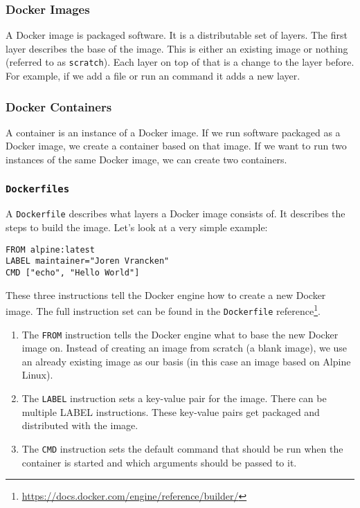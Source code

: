 \subsubsection{Docker Images}
A Docker image is packaged software. It is a distributable set of layers. The first layer describes the base of the image. This is either an existing image or nothing (referred to as \lstinline{scratch}). Each layer on top of that is a change to the layer before. For example, if we add a file or run an command it adds a new layer.

\subsubsection{Docker Containers}
A container is an instance of a Docker image. If we run software packaged as a Docker image, we create a container based on that image. If we want to run two instances of the same Docker image, we can create two containers.

\subsubsection{\texorpdfstring{\lstinline{Dockerfiles}}{Dockerfiles}}
A \lstinline{Dockerfile} describes what layers a Docker image consists of. It describes the steps to build the image. Let's look at a very simple example:

\begin{lstlisting}[caption={Very Basic \lstinline{Dockerfile}.},label={listing:dockerfile-simple},captionpos=b]
FROM alpine:latest
LABEL maintainer="Joren Vrancken"
CMD ["echo", "Hello World"]
\end{lstlisting}

These three instructions tell the Docker engine how to create a new Docker image.
The full instruction set can be found in the \lstinline{Dockerfile} reference\footnote{\url{https://docs.docker.com/engine/reference/builder/}}.

\begin{enumerate}
    \item The \lstinline{FROM} instruction tells the Docker engine what to base the new Docker image on. Instead of creating an image from scratch (a blank image), we use an already existing image as our basis (in this case an image based on Alpine Linux).

    \item The \lstinline{LABEL} instruction sets a key-value pair for the image. There can be multiple LABEL instructions. These key-value pairs get packaged and distributed with the image.

    \item The \lstinline{CMD} instruction sets the default command that should be run when the container is started and which arguments should be passed to it.
\end{enumerate}

